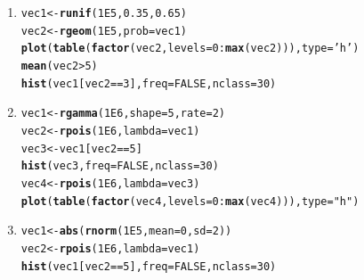 \documentclass[11pt,a4]{article}\usepackage[]{graphicx}\usepackage[]{xcolor}
\makeatletter
\newcommand{\hlnum}[1]{\textcolor[rgb]{0.686,0.059,0.569}{#1}}%
\newcommand{\hlsng}[1]{\textcolor[rgb]{0.192,0.494,0.8}{#1}}%
\newcommand{\hlopt}[1]{\textcolor[rgb]{0,0,0}{#1}}%
\newcommand{\hldef}[1]{\textcolor[rgb]{0.345,0.345,0.345}{#1}}%
\newcommand{\hlkwb}[1]{\textcolor[rgb]{0.69,0.353,0.396}{#1}}%
\newcommand{\hlkwc}[1]{\textcolor[rgb]{0.333,0.667,0.333}{#1}}%
\newcommand{\hlkwd}[1]{\textcolor[rgb]{0.737,0.353,0.396}{\textbf{#1}}}%
\newenvironment{kframe}{%
 \def\at@end@of@kframe{}%
 \ifinner\ifhmode%
  \def\at@end@of@kframe{\end{minipage}}%
  \begin{minipage}{\columnwidth}%
 \fi\fi%
 \def\FrameCommand##1{\hskip\@totalleftmargin \hskip-\fboxsep
 \colorbox{shadecolor}{##1}\hskip-\fboxsep
     \hskip-\linewidth \hskip-\@totalleftmargin \hskip\columnwidth}%
 \MakeFramed {\advance\hsize-\width
   \@totalleftmargin\z@ \linewidth\hsize
   \@setminipage}}%
 {\par\unskip\endMakeFramed%
 \at@end@of@kframe}
\newenvironment{knitrout}{}{} %
\makeatother
\begin{document}
\begin{enumerate}
\begin{enumerate}
\item
\begin{knitrout}
\color{fgcolor}\begin{kframe}
\begin{alltt}
\hldef{vec1} \hlkwb{<-} \hlkwd{runif}\hldef{(}\hlnum{1E5}\hldef{,} \hlnum{0.35}\hldef{,} \hlnum{0.65}\hldef{)}
\hldef{vec2} \hlkwb{<-} \hlkwd{rgeom}\hldef{(}\hlnum{1E5}\hldef{,} \hlkwc{prob} \hldef{= vec1)}
\hlkwd{plot}\hldef{(}\hlkwd{table}\hldef{(}\hlkwd{factor}\hldef{(vec2,} \hlkwc{levels} \hldef{=} \hlnum{0}\hlopt{:}\hlkwd{max}\hldef{(vec2))),} \hlkwc{type} \hldef{=} \hlsng{'h'}\hldef{)}
\hlkwd{mean}\hldef{(vec2} \hlopt{>} \hlnum{5}\hldef{)}
\hlkwd{hist}\hldef{(vec1[vec2} \hlopt{==} \hlnum{3}\hldef{],} \hlkwc{freq} \hldef{=} \hlnum{FALSE}\hldef{,} \hlkwc{nclass} \hldef{=} \hlnum{30}\hldef{)}
\end{alltt}
\end{kframe}
\end{knitrout}

\item
\begin{knitrout}
\color{fgcolor}\begin{kframe}
\begin{alltt}
\hldef{vec1} \hlkwb{<-} \hlkwd{rgamma}\hldef{(}\hlnum{1E6}\hldef{,} \hlkwc{shape} \hldef{=} \hlnum{5}\hldef{,} \hlkwc{rate} \hldef{=} \hlnum{2}\hldef{)}
\hldef{vec2} \hlkwb{<-} \hlkwd{rpois}\hldef{(}\hlnum{1E6}\hldef{,} \hlkwc{lambda} \hldef{= vec1)}
\hldef{vec3} \hlkwb{<-} \hldef{vec1[vec2} \hlopt{==} \hlnum{5}\hldef{]}
\hlkwd{hist}\hldef{(vec3,} \hlkwc{freq} \hldef{=} \hlnum{FALSE}\hldef{,} \hlkwc{nclass} \hldef{=} \hlnum{30}\hldef{)}
\hldef{vec4} \hlkwb{<-} \hlkwd{rpois}\hldef{(}\hlnum{1E6}\hldef{,} \hlkwc{lambda} \hldef{= vec3)}
\hlkwd{plot}\hldef{(}\hlkwd{table}\hldef{(}\hlkwd{factor}\hldef{(vec4,} \hlkwc{levels} \hldef{=} \hlnum{0}\hlopt{:}\hlkwd{max}\hldef{(vec4))),} \hlkwc{type} \hldef{=} \hlsng{"h"}\hldef{)}
\end{alltt}
\end{kframe}
\end{knitrout}

\item
\begin{knitrout}
\color{fgcolor}\begin{kframe}
\begin{alltt}
\hldef{vec1} \hlkwb{<-} \hlkwd{abs}\hldef{(}\hlkwd{rnorm}\hldef{(}\hlnum{1E5}\hldef{,} \hlkwc{mean} \hldef{=} \hlnum{0}\hldef{,} \hlkwc{sd} \hldef{=} \hlnum{2}\hldef{))}
\hldef{vec2} \hlkwb{<-} \hlkwd{rpois}\hldef{(}\hlnum{1E6}\hldef{,} \hlkwc{lambda} \hldef{= vec1)}
\hlkwd{hist}\hldef{(vec1[vec2} \hlopt{==} \hlnum{5}\hldef{],} \hlkwc{freq} \hldef{=} \hlnum{FALSE}\hldef{,} \hlkwc{nclass} \hldef{=} \hlnum{30}\hldef{)}
\end{alltt}
\end{kframe}
\end{knitrout}
\end{enumerate}



\end{enumerate}
\end{document}
